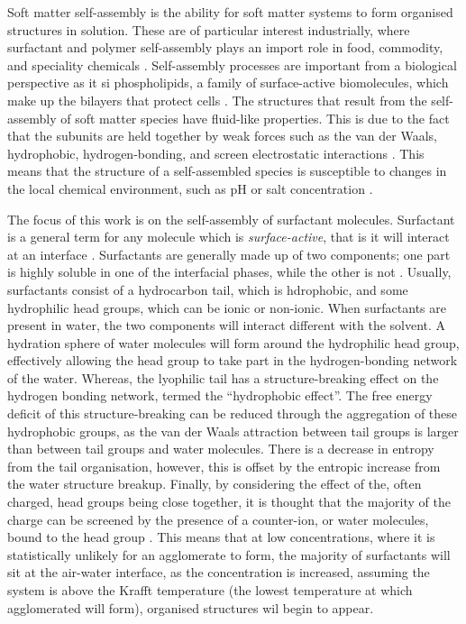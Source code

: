 Soft matter self-assembly is the ability for soft matter systems to form organised structures in solution.
These are of particular interest industrially, where surfactant and polymer self-assembly plays an import role in food, commodity, and speciality chemicals \cite{schramm_surfactants_2003}.
Self-assembly processes are important from a biological perspective as it si phospholipids, a family of surface-active biomolecules, which make up the bilayers that protect cells \cite{simons_lipid_2000}.
The structures that result from the self-assembly of soft matter species have fluid-like properties.
This is due to the fact that the subunits are held together by weak forces such as the van der Waals, hydrophobic, hydrogen-bonding, and screen electrostatic interactions \cite{israelachvili_intermolecular_2011}.
This means that the structure of a self-assembled species is susceptible to changes in the local chemical environment, such as pH or salt concentration \cite{schmaljohann_thermo-_2006,sammalkorpi_ionic_2009}.

The focus of this work is on the self-assembly of surfactant molecules.
Surfactant is a general term for any molecule which is \emph{surface-active}, that is it will interact at an interface \cite{rosen_surfactants_2012}.
Surfactants are generally made up of two components; one part is highly soluble in one of the interfacial phases, while the other is not \cite{goodwin_colloids_2009}.
Usually, surfactants consist of a hydrocarbon tail, which is hdrophobic, and some hydrophilic head groups, which can be ionic or non-ionic.
When surfactants are present in water, the two components will interact different with the solvent.
A hydration sphere of water molecules will form around the hydrophilic head group, effectively allowing the head group to take part in the hydrogen-bonding network of the water.
Whereas, the lyophilic tail has a structure-breaking effect on the hydrogen bonding network, termed the ``hydrophobic effect''.
The free energy deficit of this structure-breaking can be reduced through the aggregation of these hydrophobic groups, as the van der Waals attraction between tail groups is larger than between tail groups and water molecules.
There is a decrease in entropy from the tail organisation, however, this is offset by the entropic increase from the water structure breakup.
Finally, by considering the effect of the, often charged, head groups being close together, it is thought that the majority of the charge can be screened by the presence of a counter-ion, or water molecules, bound to the head group \cite{goodwin_colloids_2009}.
This means that at low concentrations, where it is statistically unlikely for an agglomerate to form, the majority of surfactants will sit at the air-water interface, as the concentration is increased, assuming the system is above the Krafft temperature (the lowest temperature at which agglomerated will form), organised structures wil begin to appear.

